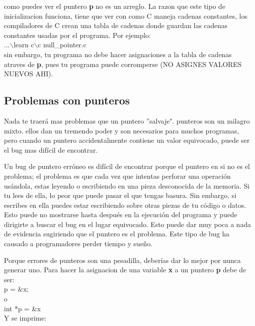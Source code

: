 \documentclass[]{article}
\begin{document}
	como puedes ver el puntero \textbf{p} no es un arreglo. La razon que este tipo de inicializacion funciona, tiene que ver con como C maneja cadenas constantes, los compiladores de C crean una tabla de cadenas donde  guardan las cadenas constantes usadas por el programa. Por ejemplo:\\
	
	...$\backslash$learn c$\backslash$c null\_pointer.c\\
	
	sin embargo, tu programa no debe hacer asignaciones a la tabla de cadenas atraves de \textbf{p}, pues tu programa puede corromperse (NO ASIGNES VALORES NUEVOS AHI).\\
	
	\subsection{Problemas con punteros}
	
	Nada te traerá mas problemas que un puntero ''salvaje". punteros son un milagro mixto. ellos dan un tremendo poder y son necesarios para muchos programas, pero cuando un puntero accidentalmente contiene un valor equivocado, puede ser el bug mas difícil de encontrar.
	
	Un bug de puntero erróneo es difícil de encontrar porque el puntero en si no es el problema; el problema es que cada vez que intentas perforar una operación usándola, estas leyendo o escribiendo en una pieza desconocida de la memoria. Si tu lees de ella, lo peor que puede pasar el que tengas basura. Sin embargo, si escribes en ella puedes estar escribiendo sobre otras piezas de tu código o datos. Esto puede no mostrarse hasta después en la ejecución del programa y puede dirigirte a buscar el bug en el lugar equivocado. Esto puede dar muy poca a nada de evidencia sugiriendo que el puntero es el problema. Este tipo de bug ha causado a programadores perder tiempo y sueño.
	
	Porque errores de punteros son una pesadilla, deberías dar lo mejor por nunca generar uno. Para hacer la asignacion de una variable \textbf{x} a un puntero \textbf{p} debe de ser:\\
	
	p = \&x;\\
	
	o\\
	
	int *p = \&x\\
	
	Y se imprime:
	
\end{document}
